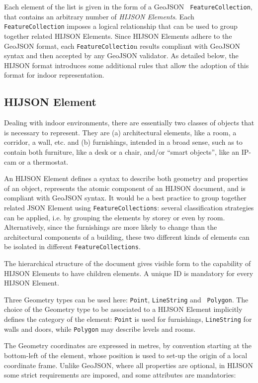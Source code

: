 Each element of the list is given in the form of a GeoJSON {\tt
FeatureCollection}, that contains an arbitrary  number of \emph{HIJSON Elements}.
Each {\tt FeatureCollection} imposes a logical relationship that can be used
to group together related HIJSON Elements. Since  HIJSON Elements adhere to
the GeoJSON format, each {\tt FeatureCollectio}n results compliant with GeoJSON
syntax and then accepted by any GeoJSON validator. As detailed below, the
HIJSON format  introduces some additional rules that allow the adoption of
this format for indoor representation.


\subsection{HIJSON Element}

Dealing with indoor environments, there are essentially two classes of objects
that is necessary to represent. They are (a) architectural elements, like a
room, a corridor, a wall, etc. and (b) furnishings, intended in a broad sense,
such as to contain both furniture, like a desk or a chair, and/or ``smart objects'',
like an IP-cam or a thermostat.

An HIJSON Element defines a syntax to describe both geometry and properties of
an object, represents the atomic component of an HIJSON document, and is compliant with GeoJSON syntax. 
It would be a best practice to group
together related JSON Element using {\tt FeatureCollections}: several classification strategies
can be applied, i.e. by grouping the elements by storey or even by room.
Alternatively, since the furnishings are more likely to change than the
architectural components of a building, these two different kinds of elements
can be isolated in different {\tt FeatureCollections}.

The hierarchical structure of the document gives visible form to the capability of HIJSON Elements to have children elements. A unique ID is mandatory for every HIJSON Element. 

Three Geometry types can be used here: {\tt Point}, {\tt LineString}  and {\tt
Polygon}. The choice of the Geometry type to be associated to a HIJSON Element
implicitly defines the category of the element: {\tt Point} is used for
furnishings, {\tt LineString} for walls and doors, while {\tt Polygon} may
describe levels and rooms.

The Geometry coordinates are expressed in metres, by convention starting
at the bottom-left of the element, whose position is used to set-up the origin of a local coordinate frame. Unlike GeoJSON, where all properties
are optional, in HIJSON some strict requirements are imposed, and some
attributes are mandatories:

